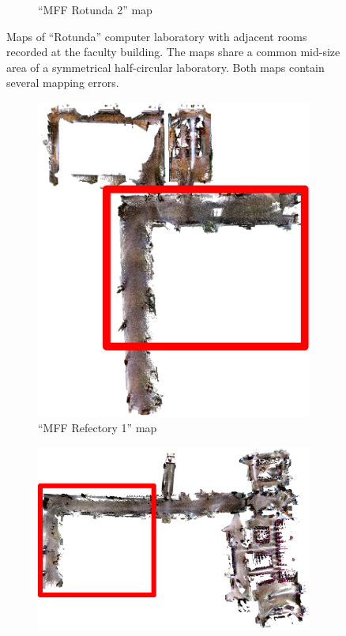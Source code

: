 \begin{figure}
\begin{subfigure}[b]{\textwidth}
        \caption{``MFF Rotunda 2'' map}
    \end{subfigure}
    \caption[MFF Rotunda maps]{Maps of ``Rotunda'' computer laboratory with adjacent rooms recorded at the faculty building. The maps share a common mid-size area of a symmetrical half-circular laboratory. Both maps contain several mapping errors.}
    \label{fig:mff_rotunda}
\end{figure}

\begin{figure}
    \centering
    \begin{subfigure}[b]{0.65\textwidth}
        \includegraphics[width=\textwidth]{../img/mff_refectory_1_highlight.png}
        \caption{``MFF Refectory 1'' map}
    \end{subfigure}
    \begin{subfigure}[b]{\textwidth}
        \includegraphics[width=\textwidth]{../img/mff_refectory_2_highlight.png}

\end{subfigure}
\end{figure}
